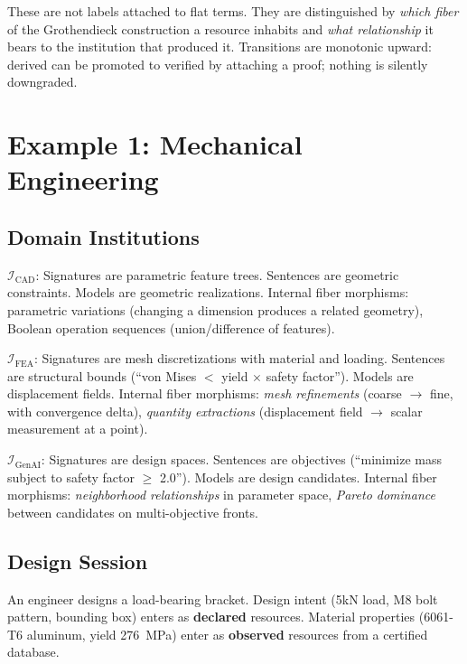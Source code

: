 \documentclass[10pt,twocolumn,letterpaper]{article}
\begin{document}
These are not labels attached to flat terms.
They are distinguished by \emph{which fiber} of the Grothendieck construction a resource inhabits and \emph{what relationship} it bears to the institution that produced it.
Transitions are monotonic upward: derived can be promoted to verified by attaching a proof; nothing is silently downgraded.


\section{Example 1: Mechanical Engineering}
\label{sec:mech}

\subsection{Domain Institutions}

\textbf{$\mathcal{I}_{\text{CAD}}$}: Signatures are parametric feature trees. Sentences are geometric constraints. Models are geometric realizations. Internal fiber morphisms: parametric variations (changing a dimension produces a related geometry), Boolean operation sequences (union/difference of features).

\textbf{$\mathcal{I}_{\text{FEA}}$}: Signatures are mesh discretizations with material and loading. Sentences are structural bounds (``von Mises $<$ yield $\times$ safety factor''). Models are displacement fields. Internal fiber morphisms: \emph{mesh refinements} (coarse $\to$ fine, with convergence delta), \emph{quantity extractions} (displacement field $\to$ scalar measurement at a point).

\textbf{$\mathcal{I}_{\text{GenAI}}$}: Signatures are design spaces. Sentences are objectives (``minimize mass subject to safety factor $\geq$ 2.0''). Models are design candidates. Internal fiber morphisms: \emph{neighborhood relationships} in parameter space, \emph{Pareto dominance} between candidates on multi-objective fronts.

\subsection{Design Session}

An engineer designs a load-bearing bracket. Design intent (5kN load, M8 bolt pattern, bounding box) enters as \textbf{declared} resources. Material properties (6061-T6 aluminum, yield 276~MPa) enter as \textbf{observed} resources from a certified database.
\end{document}
